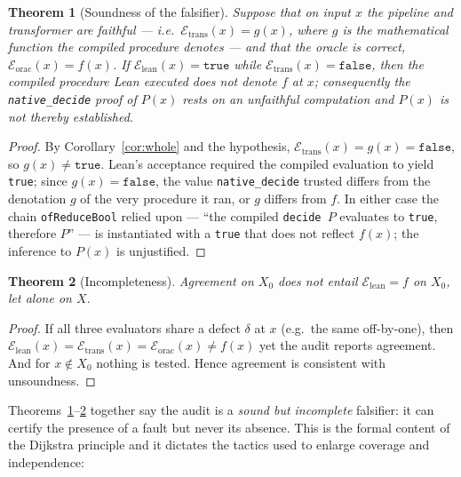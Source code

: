 \documentclass[11pt]{article}
\theoremstyle{definition}
\theoremstyle{plain}
\newtheorem{theorem}{Theorem}
\theoremstyle{remark}
\newcommand{\eval}{\mathcal{E}}
\begin{document}
\begin{theorem}[Soundness of the falsifier]\label{thm:sound}
Suppose that on input $x$ the pipeline and transformer are faithful --- i.e.\
$\eval_{\mathrm{trans}}(x) = g(x)$, where $g$ is the mathematical function the compiled procedure
\emph{denotes} --- and that the oracle is correct, $\eval_{\mathrm{orac}}(x)=f(x)$. If
$\eval_{\mathrm{lean}}(x)=\texttt{true}$ while $\eval_{\mathrm{trans}}(x)=\texttt{false}$, then the
compiled procedure Lean executed does not denote $f$ at $x$; consequently the \texttt{native\_decide}
proof of $P(x)$ rests on an unfaithful computation and $P(x)$ is not thereby established.
\end{theorem}
\begin{proof}
By Corollary~\ref{cor:whole} and the hypothesis, $\eval_{\mathrm{trans}}(x)=g(x)=\texttt{false}$, so
$g(x)\neq\texttt{true}$. Lean's acceptance required the compiled evaluation to yield \texttt{true};
since $g(x)=\texttt{false}$, the value \texttt{native\_decide} trusted differs from the denotation $g$
of the very procedure it ran, or $g$ differs from $f$. In either case the chain
\texttt{ofReduceBool} relied upon --- ``the compiled \texttt{decide }$P$ evaluates to \texttt{true},
therefore $P$'' --- is instantiated with a \texttt{true} that does not reflect $f(x)$; the inference to
$P(x)$ is unjustified.
\end{proof}

\begin{theorem}[Incompleteness]\label{thm:incomplete}
Agreement on $X_0$ does not entail $\eval_{\mathrm{lean}}=f$ on $X_0$, let alone on $X$.
\end{theorem}
\begin{proof}
If all three evaluators share a defect $\delta$ at $x$ (e.g.\ the same off-by-one), then
$\eval_{\mathrm{lean}}(x)=\eval_{\mathrm{trans}}(x)=\eval_{\mathrm{orac}}(x)\neq f(x)$ yet the audit
reports agreement. And for $x\notin X_0$ nothing is tested. Hence agreement is consistent with
unsoundness.
\end{proof}

Theorems~\ref{thm:sound}--\ref{thm:incomplete} together say the audit is a \emph{sound but incomplete}
falsifier: it can certify the presence of a fault but never its absence. This is the formal content of
the Dijkstra principle and it dictates the tactics used to enlarge coverage and independence:
\end{document}

